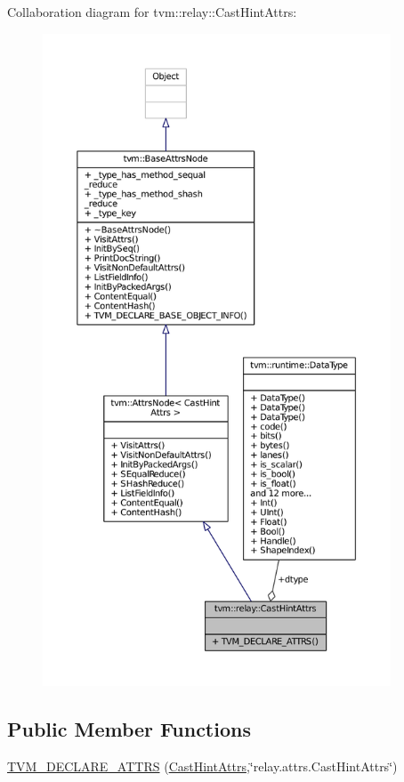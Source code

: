 Collaboration diagram for tvm\+:\+:relay\+:\+:Cast\+Hint\+Attrs\+:
\nopagebreak
\begin{figure}[H]
\begin{center}
\leavevmode
\includegraphics[height=550pt]{structtvm_1_1relay_1_1CastHintAttrs__coll__graph}
\end{center}
\end{figure}
\subsection*{Public Member Functions}
\begin{DoxyCompactItemize}
\item 
\hyperlink{structtvm_1_1relay_1_1CastHintAttrs_afc0f564be8de59a52e639c0746edd87c}{T\+V\+M\+\_\+\+D\+E\+C\+L\+A\+R\+E\+\_\+\+A\+T\+T\+RS} (\hyperlink{structtvm_1_1relay_1_1CastHintAttrs}{Cast\+Hint\+Attrs},\char`\"{}relay.\+attrs.\+Cast\+Hint\+Attrs\char`\"{})
\end{DoxyCompactItemize}
